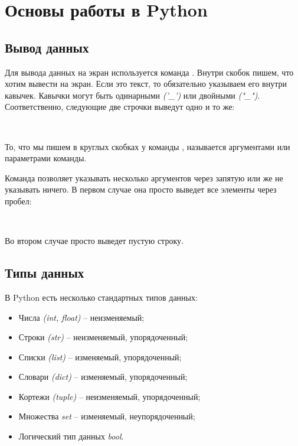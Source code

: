 \section{Основы работы в Python}

\subsection{Вывод данных}

Для вывода данных на экран используется команда . Внутри скобок пишем, что хотим вывести на экран. Если это текст, то обязательно указываем его внутри кавычек. Кавычки могут быть одинарными \textit{('\_')} или двойными \textit{("\_")}. Соответственно, следующие две строчки выведут одно и то же:

\begin{flushleft}
	 \\
\end{flushleft}

То, что мы пишем в круглых скобках у команды , называется аргументами или параметрами команды.

Команда  позволяет указывать несколько аргументов через запятую или же не указывать ничего. В первом случае она просто выведет все элементы через пробел:

\begin{flushleft}
	 \\
\end{flushleft}

Во втором случае просто выведет пустую строку.

\subsection{Типы данных}

В Python есть несколько стандартных типов данных:

\begin{itemize}
	\setlength\itemsep{0.01cm}
	\item Числа \textit{(int, float)} -- неизменяемый;
	\item Строки \textit{(str)} -- неизменяемый, упорядоченный;
	\item Списки \textit{(list)} -- изменяемый, упорядоченный;
	\item Словари \textit{(dict)} -- изменяемый, упорядоченный;
	\item Кортежи \textit{(tuple)} -- неизменяемый, упорядоченный;
	\item Множества \textit{set} -- изменяемый, неупорядоченный;
	\item Логический тип данных \textit{bool}.
\end{itemize}

